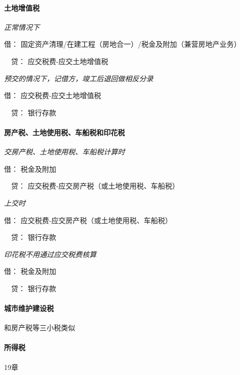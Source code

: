 \documentclass[UTF8,12pt]{ctexart}
\newenvironment{Dr}{\noindent 借：}{\par}
\newenvironment{Cr}{\noindent \ \ 贷：}{\par}
\numberwithin{equation}{section} %
\numberwithin{figure}{section}
\numberwithin{table}{section}
\begin{document}
	\paragraph{土地增值税}
	\textit{正常情况下}
	
	\begin{Dr}
		固定资产清理/在建工程（房地合一）/税金及附加（兼营房地产业务）
	\end{Dr}
	\begin{Cr}
		应交税费-应交土地增值税
	\end{Cr}

	\textit{预交的情况下，记借方，竣工后退回做相反分录}
	
	\begin{Dr}
		应交税费-应交土地增值税
	\end{Dr}
	\begin{Cr}
		银行存款
	\end{Cr}
	
	\paragraph{房产税、土地使用税、车船税和印花税}
	\textit{交房产税、土地使用税、车船税计算时}
	
	\begin{Dr}
		税金及附加
	\end{Dr}
	\begin{Cr}
		应交税费-应交房产税（或土地使用税、车船税）
	\end{Cr}

	\textit{上交时}
	
	\begin{Dr}
		应交税费-应交房产税（或土地使用税、车船税）
	\end{Dr}
	\begin{Cr}
		银行存款
	\end{Cr}

	\textit{印花税不用通过应交税费核算}
	
	\begin{Dr}
		税金及附加
	\end{Dr}
	\begin{Cr}
		银行存款
	\end{Cr}

	\paragraph{城市维护建设税}
	和房产税等三小税类似
	
	\paragraph{所得税}
	19章
	
\end{document}
